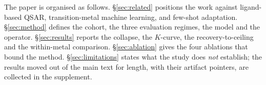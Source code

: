 The paper is organised as follows. \S\ref{sec:related} positions the work
against ligand-based QSAR, transition-metal machine learning, and few-shot
adaptation. \S\ref{sec:method} defines the cohort, the three evaluation regimes,
the model and the \fsma{} operator. \S\ref{sec:results} reports the collapse,
the $K$-curve, the recovery-to-ceiling and the within-metal comparison.
\S\ref{sec:ablation} gives the four ablations that bound the method.
\S\ref{sec:limitations} states what the study does \emph{not} establish; the
results moved out of the main text for length, with their artifact pointers, are
collected in the supplement.
